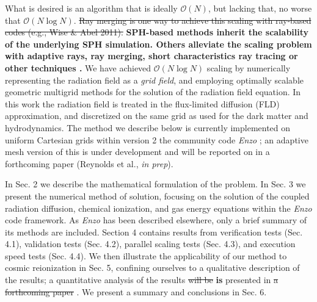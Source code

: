 What is desired is an algorithm that is ideally $\mathcal O(N)$, but lacking that, no worse that $\mathcal O(N\log N)$. \st{Ray merging is one way to achieve this scaling with ray-based codes (e.g., Wise \& Abel 2011).} {\bf SPH-based methods \citep{PawlikSchaye2008, PawlikSchaye2011, Petkova11} inherit the scalability of the underlying SPH simulation. Others alleviate the scaling problem with adaptive rays, ray merging, short characteristics ray tracing or other techniques \citep{RazoumovCardall2005, Mellema2006, TracCen2007, ShinTracCen2008, WiseAbel11}. }  We have achieved $\mathcal O(N\log N)$ scaling by numerically representing the radiation field as a {\em grid field}, and employing optimally scalable geometric multigrid methods for the solution of the radiation field equation. In this work the radiation field is treated in the flux-limited diffusion (FLD) approximation, and discretized on the same grid as used for the dark matter and hydrodynamics. The method we describe below is currently implemented on uniform Cartesian grids within version 2 the community code  {\em Enzo} {\bf \citep{Enzo2014}}; an adaptive mesh version of this is under development and will be reported on in a forthcoming paper (Reynolds et al., {\em in prep}). 

In Sec. 2 we describe the mathematical formulation of the problem. In Sec. 3 we present the numerical method of solution, focusing on the solution of the coupled radiation diffusion, chemical ionization, and gas energy equations within the {\em Enzo} code framework. As {\em Enzo} has been described elsewhere, only a brief summary of its methods are included.  Section 4 contains results from verification tests (Sec. 4.1), validation tests (Sec. 4.2), parallel scaling tests (Sec. 4.3), and execution speed tests (Sec. 4.4).  We then illustrate the applicability of our method to cosmic reionization in Sec. 5, confining ourselves to a qualitative description of the results; a quantitative analysis of the results \st{will be} {\bf is} presented in \st{a forthcoming paper} {\bf \citep{So2014} }. We present a summary and conclusions in Sec. 6. 

